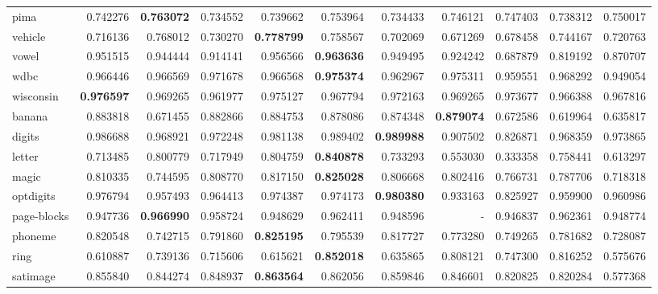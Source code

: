 \begin{tabular}{lrrrrrrrrrr}
pima            &   0.742276 &  \textbf{0.763072} &  0.734552 &  0.739662 &  0.753964 &  0.734433 &  0.746121 &  0.747403 &  0.738312 &  0.750017 \\
vehicle         &   0.716136 &  0.768012 &  0.730270 &  \textbf{0.778799} &  0.758567 &  0.702069 &  0.671269 &  0.678458 &  0.744167 &  0.720763 \\
vowel           &   0.951515 &  0.944444 &  0.914141 &  0.956566 &  \textbf{0.963636} &  0.949495 &  0.924242 &  0.687879 &  0.819192 &  0.870707 \\
wdbc            &   0.966446 &  0.966569 &  0.971678 &  0.966568 &  \textbf{0.975374} &  0.962967 &  0.975311 &  0.959551 &  0.968292 &  0.949054 \\
wisconsin       &   \textbf{0.976597} &  0.969265 &  0.961977 &  0.975127 &  0.967794 &  0.972163 &  0.969265 &  0.973677 &  0.966388 &  0.967816 \\
banana          &   0.883818 &  0.671455 &  0.882866 &  0.884753 &  0.878086 &  0.874348 &  \textbf{0.879074} &  0.672586 &  0.619964 &  0.635817 \\
digits          &   0.986688 &  0.968921 &  0.972248 &  0.981138 &  0.989402 &  \textbf{0.989988} &  0.907502 &  0.826871 &  0.968359 &  0.973865 \\
letter          &   0.713485 &  0.800779 &  0.717949 &  0.804759 &  \textbf{0.840878} &  0.733293 &  0.553030 &  0.333358 &  0.758441 &  0.613297 \\
magic           &   0.810335 &  0.744595 &  0.808770 &  0.817150 &  \textbf{0.825028} &  0.806668 &  0.802416 &  0.766731 &  0.787706 &  0.718318 \\
optdigits       &   0.976794 &  0.957493 &  0.964413 &  0.974387 &  0.974173 &  \textbf{0.980380} &  0.933163 &  0.825927 &  0.959900 &  0.960986 \\
page-blocks     &   0.947736 &  \textbf{0.966990} &  0.958724 &  0.948629 &  0.962411 &  0.948596 &       - &  0.946837 &  0.962361 &  0.948774 \\
phoneme         &   0.820548 &  0.742715 &  0.791860 &  \textbf{0.825195} &  0.795539 &  0.817727 &  0.773280 &  0.749265 &  0.781682 &  0.728087 \\
ring            &   0.610887 &  0.739136 &  0.715606 &  0.615621 &  \textbf{0.852018} &  0.635865 &  0.808121 &  0.747300 &  0.816252 &  0.575676 \\
satimage        &   0.855840 &  0.844274 &  0.848937 &  \textbf{0.863564} &  0.862056 &  0.859846 &  0.846601 &  0.820825 &  0.820284 &  0.577368 \\

\end{tabular}
